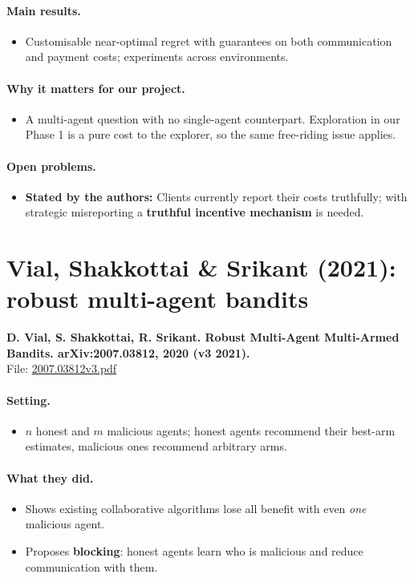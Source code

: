 \documentclass[11pt]{article}
\newcommand{\stated}{\textcolor{green!40!black}{\textbf{Stated by the authors:}}}
\newcommand{\file}[1]{\url{#1}}
\begin{document}
\paragraph{Main results.}
\begin{itemize}\item Customisable near-optimal regret with guarantees on both communication and payment costs; experiments across environments.\end{itemize}
\paragraph{Why it matters for our project.}
\begin{itemize}\item A multi-agent question with no single-agent counterpart. Exploration in our Phase 1 is a pure cost to the explorer, so the same free-riding issue applies.\end{itemize}
\paragraph{Open problems.}
\begin{itemize}\item \stated{} Clients currently report their costs truthfully; with strategic misreporting a \textbf{truthful incentive mechanism} is needed.\end{itemize}
\section{Vial, Shakkottai \& Srikant (2021): robust multi-agent bandits}
\textbf{D. Vial, S. Shakkottai, R. Srikant. Robust Multi-Agent Multi-Armed Bandits. arXiv:2007.03812, 2020 (v3 2021).}\\ File: \file{2007.03812v3.pdf}
\paragraph{Setting.}
\begin{itemize}\item $n$ honest and $m$ malicious agents; honest agents recommend their best-arm estimates, malicious ones recommend arbitrary arms.\end{itemize}
\paragraph{What they did.}
\begin{itemize}\item Shows existing collaborative algorithms lose all benefit with even \emph{one} malicious agent.\item Proposes \textbf{blocking}: honest agents learn who is malicious and reduce communication with them.\end{itemize}
\end{document}
